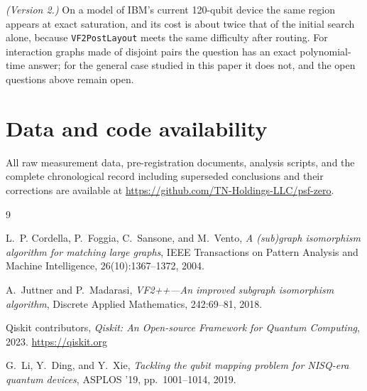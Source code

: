 \documentclass[11pt]{article}
\begin{document}
\emph{(Version 2.)} On a model of IBM's current 120-qubit device the same
region appears at exact saturation, and its cost is about twice that of
the initial search alone, because \texttt{VF2PostLayout} meets the same
difficulty after routing. For interaction graphs made of disjoint pairs
the question has an exact polynomial-time answer; for the general case
studied in this paper it does not, and the open questions above remain
open.

\section*{Data and code availability}

All raw measurement data, pre-registration documents, analysis scripts,
and the complete chronological record including superseded conclusions
and their corrections are available at
\url{https://github.com/TN-Holdings-LLC/psf-zero}.

\begin{thebibliography}{9}

L.~P. Cordella, P.~Foggia, C.~Sansone, and M.~Vento,
\emph{A (sub)graph isomorphism algorithm for matching large graphs},
IEEE Transactions on Pattern Analysis and Machine Intelligence,
26(10):1367--1372, 2004.

A.~Juttner and P.~Madarasi,
\emph{VF2++---An improved subgraph isomorphism algorithm},
Discrete Applied Mathematics, 242:69--81, 2018.

Qiskit contributors,
\emph{Qiskit: An Open-source Framework for Quantum Computing},
2023. \url{https://qiskit.org}

G.~Li, Y.~Ding, and Y.~Xie,
\emph{Tackling the qubit mapping problem for NISQ-era quantum devices},
ASPLOS '19, pp.~1001--1014, 2019.

\end{thebibliography}
\end{document}
